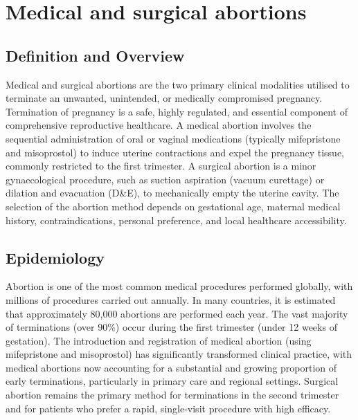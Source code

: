 \chapter{Medical and surgical abortions}

\section*{Definition and Overview}
Medical and surgical abortions are the two primary clinical modalities utilised to terminate an unwanted, unintended, or medically compromised pregnancy. Termination of pregnancy is a safe, highly regulated, and essential component of comprehensive reproductive healthcare. A medical abortion involves the sequential administration of oral or vaginal medications (typically mifepristone and misoprostol) to induce uterine contractions and expel the pregnancy tissue, commonly restricted to the first trimester. A surgical abortion is a minor gynaecological procedure, such as suction aspiration (vacuum curettage) or dilation and evacuation (D\&E), to mechanically empty the uterine cavity. The selection of the abortion method depends on gestational age, maternal medical history, contraindications, personal preference, and local healthcare accessibility.

\section*{Epidemiology}
Abortion is one of the most common medical procedures performed globally, with millions of procedures carried out annually. In many countries, it is estimated that approximately 80,000 abortions are performed each year. The vast majority of terminations (over 90\%) occur during the first trimester (under 12 weeks of gestation). The introduction and registration of medical abortion (using mifepristone and misoprostol) has significantly transformed clinical practice, with medical abortions now accounting for a substantial and growing proportion of early terminations, particularly in primary care and regional settings. Surgical abortion remains the primary method for terminations in the second trimester and for patients who prefer a rapid, single-visit procedure with high efficacy.

